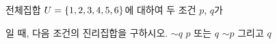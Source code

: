 전체집합 $U=\{1{,}\mkern3mu\mathopen{}2{,}\mkern3mu\mathopen{}3{,}\mkern3mu\mathopen{}4{,}\mkern3mu\mathopen{}5{,}\mkern3mu\mathopen{}6\}$에 대하여 두 조건 $p$, $q$가 \par\smallskip{}\par\smallskip\noindent 일 때, 다음 조건의 진리집합을 구하시오.
 $\sim q$
 $p$ 또는 $q$
 $\sim p$ 그리고 $q$
